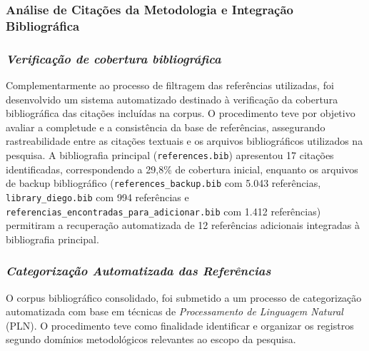 \subsubsection{Análise de Citações da Metodologia e Integração Bibliográfica}

\subsubsection{\textit{Verificação de cobertura bibliográfica}}


Complementarmente ao processo de filtragem das referências utilizadas, foi desenvolvido um sistema automatizado destinado à verificação da cobertura bibliográfica das citações incluídas na corpus. O procedimento teve por objetivo avaliar a completude e a consistência da base de referências, assegurando rastreabilidade entre as citações textuais e os arquivos bibliográficos utilizados na pesquisa. A bibliografia principal (\texttt{references.bib}) apresentou 17 citações identificadas, correspondendo a 29,8\% de cobertura inicial, enquanto os arquivos de backup bibliográfico (\texttt{references\_backup.bib} com 5.043 referências, \texttt{library\_diego.bib} com 994 referências e \texttt{referencias\_encontradas\_para\_adicionar.bib} com 1.412 referências) permitiram a recuperação automatizada de 12 referências adicionais integradas à bibliografia principal.

\subsubsection{\textit{Categorização Automatizada das Referências}}


O corpus bibliográfico consolidado, foi submetido a um processo de categorização automatizada com base em técnicas de \textit{Processamento de Linguagem Natural} (PLN). O procedimento teve como finalidade identificar e organizar os registros segundo domínios metodológicos relevantes ao escopo da pesquisa.

